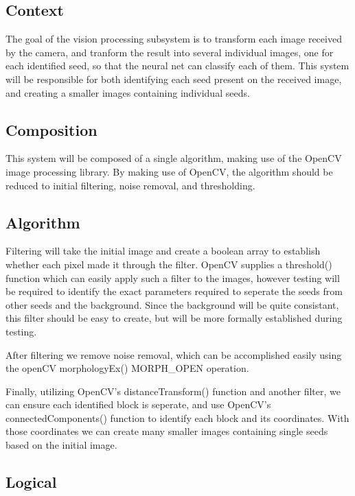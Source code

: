 
\subsection{Context}

The goal of the vision processing subsystem is to transform each image received by the camera, and tranform the result into several
individual images, one for each identified seed, so that the neural net can classify each of them. 
This system will be responsible for both identifying each seed present on the received image, and creating a smaller images containing individual seeds.

\subsection{Composition} 

This system will be composed of a single algorithm, making use of the OpenCV image processing library.
By making use of OpenCV, the algorithm should be reduced to initial filtering, noise removal, and thresholding.

\subsection{Algorithm}
Filtering will take the initial image and create a boolean array to establish whether each pixel made it through the filter.
OpenCV supplies a threshold() function which can easily apply such a filter to the images, however testing will be required to identify the exact parameters required to seperate the seeds from other seeds and the background. Since the background will be quite consistant, this filter should be easy to create, but will be more formally established during testing.

After filtering we remove noise removal, which can be accomplished easily using the openCV morphologyEx() MORPH\_OPEN operation. 

Finally, utilizing OpenCV's distanceTransform() function and another filter, we can ensure each identified block is seperate, and use OpenCV's connectedComponents() function to identify each block and its coordinates. With those coordinates we can create many smaller images containing single seeds based on the initial image.

\subsection{Logical}

